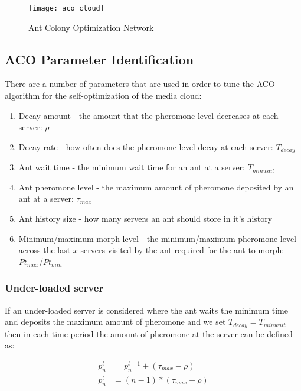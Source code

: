 \begin{figure}
	\centering
	\texttt{[image: aco\_cloud]}
	\caption{Ant Colony Optimization Network}
	\label{fig:antnetwork}
\end{figure}

\subsection{ACO Parameter Identification}

There are a number of parameters that are used in order to tune the ACO algorithm for the self-optimization of the media cloud:

\begin{enumerate}
	\item Decay amount - the amount that the pheromone level decreases at each server: $\rho$
	\item Decay rate - how often does the pheromone level decay at each server: $T_{decay}$
	\item Ant wait time - the minimum wait time for an ant at a server: $T_{minwait}$
	\item Ant pheromone level - the maximum amount of pheromone deposited by an ant at a server: $\tau_{max}$
	\item Ant history size - how many servers an ant should store in it's history
	\item Minimum/maximum morph level - the minimum/maximum pheromone level across the last $x$ servers visited by the ant required for the ant to morph: $Pt_{max}$/$Pt_{min}$
\end{enumerate}

\subsubsection{Under-loaded server}

If an under-loaded server is considered where the ant waits the minimum time and deposits the maximum amount of pheromone and we set $T_{decay} = T_{minwait}$ then in each time period the amount of pheromone at the server can be defined as:

\begin{equation}
\begin{aligned}
p^{t}_{n} &= p^{t-1}_{n} + (\tau_{max} - \rho) \\
p^{t}_{n} &= (n - 1) * (\tau_{max} - \rho)
\end{aligned}
\end{equation}

